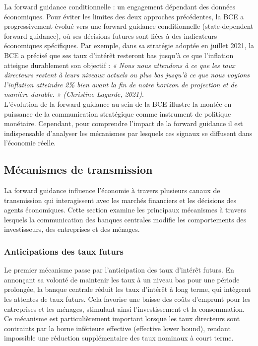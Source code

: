 La forward guidance conditionnelle \citep{blinder2017} : un engagement dépendant des données économiques. Pour éviter les limites des deux approches précédentes, la BCE a progressivement évolué vers une forward guidance conditionnelle (state-dependent forward guidance), où ses décisions futures sont liées à des indicateurs économiques spécifiques. Par exemple, dans sa stratégie adoptée en juillet 2021, la BCE a précisé que ses taux d’intérêt resteront bas jusqu’à ce que l’inflation atteigne durablement son objectif :
\textit{« Nous nous attendons à ce que les taux directeurs restent à leurs niveaux actuels ou plus bas jusqu’à ce que nous voyions l’inflation atteindre 2\% bien avant la fin de notre horizon de projection et de manière durable. » (Christine Lagarde, 2021)}.\\

L’évolution de la forward guidance au sein de la BCE illustre la montée en puissance de la communication stratégique comme instrument de politique monétaire. Cependant, pour comprendre l’impact de la forward guidance il est indispensable d’analyser les mécanismes par lesquels ces signaux se diffusent dans l’économie réelle.

\subsection{Mécanismes de transmission}

La forward guidance influence l’économie à travers plusieurs canaux de transmission qui interagissent avec les marchés financiers et les décisions des agents économiques. Cette section examine les principaux mécanismes à travers lesquels la communication des banques centrales modifie les comportements des investisseurs, des entreprises et des ménages.

\subsubsection{Anticipations des taux futurs}

Le premier mécanisme passe par l’anticipation des taux d’intérêt futurs. En annonçant sa volonté de maintenir les taux à un niveau bas pour une période prolongée, la banque centrale réduit les taux d’intérêt à long terme, qui intègrent les attentes de taux futurs. Cela favorise une baisse des coûts d’emprunt pour les entreprises et les ménages, stimulant ainsi l’investissement et la consommation. Ce mécanisme est particulièrement important lorsque les taux directeurs sont contraints par la borne inférieure effective (effective lower bound), rendant impossible une réduction supplémentaire des taux nominaux à court terme.\\ 

